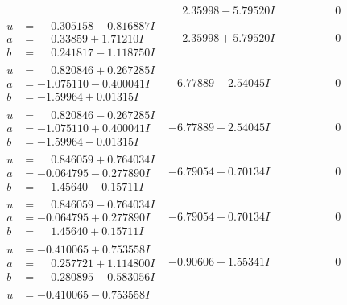 \documentclass[1p]{elsarticle_modified}
\theoremstyle{definition}
\begin{document}
$$\begin{array}{c|c|c}
 & \phantom{-}2.35998 - 5.79520 I & \phantom{-0.000000 } 0 \\ \hline\begin{aligned}
u &= \phantom{-}0.305158 - 0.816887 I \\
a &= \phantom{-}0.33859 + 1.71210 I \\
b &= \phantom{-}0.241817 - 1.118750 I\end{aligned}
 & \phantom{-}2.35998 + 5.79520 I & \phantom{-0.000000 } 0 \\ \hline\begin{aligned}
u &= \phantom{-}0.820846 + 0.267285 I \\
a &= -1.075110 - 0.400041 I \\
b &= -1.59964 + 0.01315 I\end{aligned}
 & -6.77889 + 2.54045 I & \phantom{-0.000000 } 0 \\ \hline\begin{aligned}
u &= \phantom{-}0.820846 - 0.267285 I \\
a &= -1.075110 + 0.400041 I \\
b &= -1.59964 - 0.01315 I\end{aligned}
 & -6.77889 - 2.54045 I & \phantom{-0.000000 } 0 \\ \hline\begin{aligned}
u &= \phantom{-}0.846059 + 0.764034 I \\
a &= -0.064795 - 0.277890 I \\
b &= \phantom{-}1.45640 - 0.15711 I\end{aligned}
 & -6.79054 - 0.70134 I & \phantom{-0.000000 } 0 \\ \hline\begin{aligned}
u &= \phantom{-}0.846059 - 0.764034 I \\
a &= -0.064795 + 0.277890 I \\
b &= \phantom{-}1.45640 + 0.15711 I\end{aligned}
 & -6.79054 + 0.70134 I & \phantom{-0.000000 } 0 \\ \hline\begin{aligned}
u &= -0.410065 + 0.753558 I \\
a &= \phantom{-}0.257721 + 1.114800 I \\
b &= \phantom{-}0.280895 - 0.583056 I\end{aligned}
 & -0.90606 + 1.55341 I & \phantom{-0.000000 } 0 \\ \hline\begin{aligned}
u &= -0.410065 - 0.753558 I \\

\end{aligned}
\end{array}$$
\end{document}
